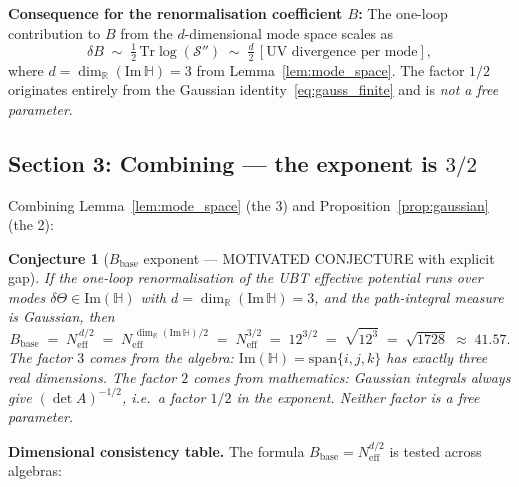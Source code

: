 \documentclass[11pt,a4paper]{article}
\newtheorem{conjecture}{Conjecture}
\theoremstyle{definition}
\theoremstyle{remark}
\begin{document}
\textbf{Consequence for the renormalisation coefficient $B$:}
The one-loop contribution to $B$ from the $d$-dimensional mode space scales as
\begin{equation}
  \delta B \;\sim\; \tfrac{1}{2}\,\mathrm{Tr}\log(\mathcal{S}'')
           \;\sim\; \tfrac{d}{2}\,[\text{UV divergence per mode}],
  \label{eq:deltaB}
\end{equation}
where $d = \dim_\mathbb{R}(\mathrm{Im}\,\mathbb{H}) = 3$ from Lemma~\ref{lem:mode_space}.
The factor $1/2$ originates entirely from the Gaussian identity~\eqref{eq:gauss_finite}
and is \emph{not a free parameter}.

\subsection{Section 3: Combining — the exponent is \texorpdfstring{$3/2$}{3/2}}
\label{sec:exponent}

Combining Lemma~\ref{lem:mode_space} (the 3) and
Proposition~\ref{prop:gaussian} (the 2):

\begin{conjecture}[$B_{\mathrm{base}}$ exponent — MOTIVATED CONJECTURE with explicit gap]
\label{conj:B_exponent}
  If the one-loop renormalisation of the UBT effective potential runs over
  modes $\delta\Theta \in \mathrm{Im}(\mathbb{H})$ with
  $d = \dim_\mathbb{R}(\mathrm{Im}\,\mathbb{H}) = 3$,
  and the path-integral measure is Gaussian, then
  \begin{equation}
    B_{\mathrm{base}}
      \;=\; N_{\mathrm{eff}}^{\,d/2}
      \;=\; N_{\mathrm{eff}}^{\,\dim_\mathbb{R}(\mathrm{Im}\,\mathbb{H})/2}
      \;=\; N_{\mathrm{eff}}^{3/2}
      \;=\; 12^{3/2}
      \;=\; \sqrt{12^3}
      \;=\; \sqrt{1728}
      \;\approx\; 41.57.
    \label{eq:B_exponent_main}
  \end{equation}
  The factor $3$ comes from the algebra: $\mathrm{Im}(\mathbb{H}) = \mathrm{span}\{i,j,k\}$
  has exactly three real dimensions.
  The factor $2$ comes from mathematics: Gaussian integrals always give
  $(\det A)^{-1/2}$, i.e.\ a factor $1/2$ in the exponent.
  \emph{Neither factor is a free parameter.}
\end{conjecture}

\textbf{Dimensional consistency table.}
The formula $B_{\mathrm{base}} = N_{\mathrm{eff}}^{d/2}$ is tested across algebras:
\end{document}
